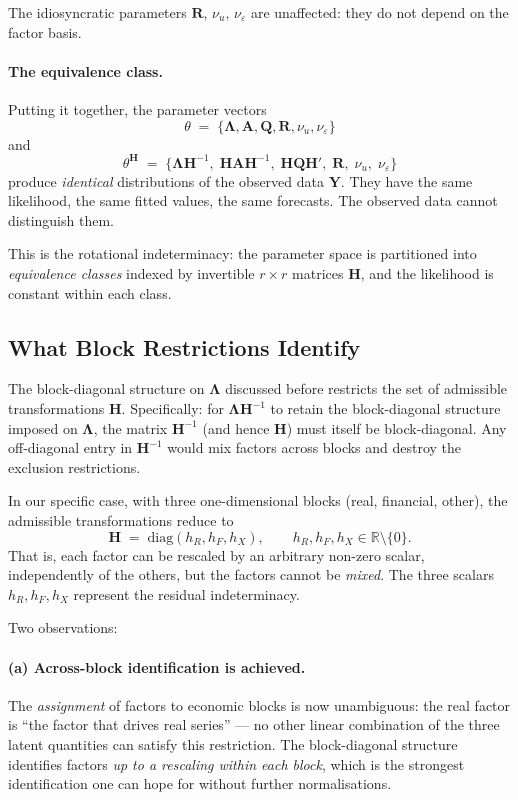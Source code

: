 \documentclass[11pt, a4paper, oneside]{article}
\newcommand{\mL}{\boldsymbol{\Lambda}}
\begin{document}
The idiosyncratic parameters $\mathbf{R}$, $\nu_u$, $\nu_\varepsilon$
are unaffected: they do not depend on the factor basis.

\paragraph{The equivalence class.}
Putting it together, the parameter vectors
\[
\theta \;=\; \{\mL, \mathbf{A}, \mathbf{Q}, \mathbf{R}, \nu_u, \nu_\varepsilon\}
\]
and
\[
\theta^\mathbf{H} \;=\; \{\mL \mathbf{H}^{-1},\; \mathbf{H} \mathbf{A} \mathbf{H}^{-1},\; \mathbf{H} \mathbf{Q} \mathbf{H}',\; \mathbf{R},\; \nu_u,\; \nu_\varepsilon\}
\]
produce \emph{identical} distributions of the observed data $\mathbf{Y}$.
They have the same likelihood, the same fitted values, the same
forecasts. The observed data cannot distinguish them.

This is the rotational indeterminacy: the parameter space is partitioned
into \emph{equivalence classes} indexed by invertible $r \times r$
matrices $\mathbf{H}$, and the likelihood is constant within each class.

\subsection{What Block Restrictions Identify}
\label{subsec:rot-block-identification}

The block-diagonal structure on $\mL$ discussed before restricts the set of admissible
transformations $\mathbf{H}$. Specifically: for
$\mL \mathbf{H}^{-1}$ to retain the block-diagonal
structure imposed on $\mL$, the matrix $\mathbf{H}^{-1}$
(and hence $\mathbf{H}$) must itself be block-diagonal. Any
off-diagonal entry in $\mathbf{H}^{-1}$ would mix factors across
blocks and destroy the exclusion restrictions.

In our specific case, with three
one-dimensional blocks (real, financial, other), the admissible
transformations reduce to
\begin{equation}
\mathbf{H} \;=\; \mathrm{diag}(h_R, h_F, h_X), \qquad h_R, h_F, h_X \in \mathbb{R} \setminus \{0\}.
\label{eq:rot-block-H}
\end{equation}
That is, each factor can be rescaled by an arbitrary non-zero scalar,
independently of the others, but the factors cannot be \emph{mixed}.
The three scalars $h_R, h_F, h_X$ represent the residual
indeterminacy.

Two observations:

\paragraph{(a) Across-block identification is achieved.}
The \emph{assignment} of factors to economic blocks is now
unambiguous: the real factor is ``the factor that drives real
series'' — no other linear combination of the three latent quantities
can satisfy this restriction. The block-diagonal structure identifies
factors \emph{up to a rescaling within each block}, which is the
strongest identification one can hope for without further
normalisations.
\end{document}
